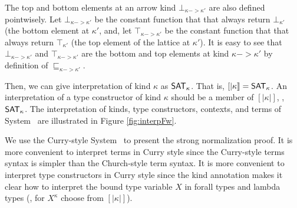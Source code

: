 The top and bottom elements at an arrow kind $\bot_{\kappa -> \kappa'}$
are also defined pointwisely. Let $\bot_{\kappa -> \kappa'}$ be
the constant function that that always return $\bot_{\kappa'}$
(the bottom element at $\kappa'$, and, let $\top_{\kappa -> \kappa'}$ be
the constant function that that always return $\top_{\kappa'}$
(the top element of the lattice at $\kappa'$). It is easy to see that
$\bot_{\kappa -> \kappa'}$ and $\top_{\kappa -> \kappa'}$
are the bottom and top elements at kind $\kappa -> \kappa'$
by definition of $\sqsubseteq_{\kappa -> \kappa'}$.

Then, we can give interpretation of kind $\kappa$ as $\mathsf{SAT}_\kappa$.
That is, $[| \kappa |] = \mathsf{SAT}_\kappa$. An interpretation of a type constructor
of kind $\kappa$ should be a member of $[| \kappa |]$, \ie, $\mathsf{SAT}_\kappa$.
The interpretation of kinds, type constructors, contexts, and
terms of System \Fw\ are illustrated in Figure \ref{fig:interpFw}. 

We use the Curry-style System \Fw\ to present the strong normalization
proof. It is more convenient to interpret terms in Curry style since
the Curry-style terms syntax is simpler than the Church-style term syntax.
It is more convenient to interpret type constructors in Curry style since
the kind annotation makes it clear how to interpret the bound type variable $X$
in forall types and lambda types (\ie, for $X^\kappa$ choose from $[|\kappa|]$).

